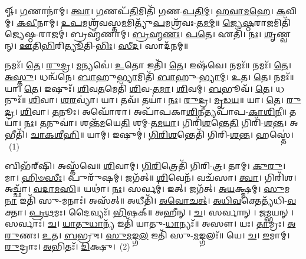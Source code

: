 \newcommand{\akhkhi}{\char"0916\char"094D\char"0916\char"093F\char"E009\hspace{-2ex} \char"E009\hspace{1.2ex}}

𑍐। \ul{𑌗}\-𑌣𑌾𑌨𑌾॑𑌮𑍍। \ul{𑌤𑍍𑌵𑌾}\-। \ul{𑌗}\-𑌣𑌪᳴\-\ul{𑌤𑌿}\-𑌮𑌿𑌤𑌿᳴ \ul{𑌗}\-𑌣-\-\ul{𑌪}\-\-\ul{𑌤𑌿}\-\-\ul{𑌮𑍍}\-। \ul{𑌹}\-\-\ul{𑌵𑌾}\-\-\ul{𑌮}\-\-\ul{𑌹𑍇}\-। \ul{𑌕}\-𑌵𑌿𑌮𑍍। \ul{𑌕}\-\-\ul{𑌵𑍀}\-𑌨𑌾𑌮𑍍। \ul{𑌉}\-\-\ul{𑌪}\-𑌮𑌶𑍍𑌰᳴𑌵𑌸𑍍𑌤\-\ul{𑌮}\-𑌮𑌿𑌤𑍍𑌯𑍁᳴\-\ul{𑌪}\-𑌮𑌶𑍍𑌰᳴𑌵𑌃-\-\ul{𑌤}\-\-\ul{𑌮}\-\-\ul{𑌮𑍍}\-॥ 
\-\ul{𑌜𑍍𑌯𑍇}\-\-\ul{𑌷𑍍𑌠}\-𑌰𑌾\-\ul{𑌜}\-𑌮𑌿𑌤𑌿᳴ 𑌜𑍍𑌯𑍇𑌷𑍍𑌠-𑌰𑌾𑌜𑌮𑍍॑। 𑌬𑍍𑌰𑌹𑍍𑌮᳴𑌣𑌾𑌮𑍍। \ul{𑌬𑍍𑌰}\-\-\ul{𑌹𑍍𑌮}\-\-\ul{𑌣𑌃}\-। \ul{𑌪}\-\-\ul{𑌤𑍇}\-। 𑌏𑌤𑌿᳴। \ul{𑌨𑌃}\-। \ul{𑌶𑍃}\-𑌣𑍍𑌵𑌨𑍍। \ul{𑌊}\-𑌤𑌿\-\ul{𑌭𑌿}\-𑌰𑌿\-\ul{𑌤𑍍𑌯𑍂}\-𑌤𑌿-\-\ul{𑌭𑌿𑌃}\-। \ul{𑌸𑍀}\-\-\ul{𑌦}\-। 𑌸𑌾𑌦᳴𑌨𑌮𑍍॥ 


𑌨𑌮𑌃᳴। \ul{𑌤𑍇}\-। \ul{𑌰𑍁}\-\-\ul{𑌦𑍍𑌰}\-। \ul{𑌮}\-𑌨𑍍𑌯𑌵𑍇॑। \ul{𑌉}\-𑌤𑍋 𑌇𑌤𑌿᳴। \ul{𑌤𑍇}\-। 𑌇𑌷᳴𑌵𑍇। 𑌨𑌮𑌃᳴॥ 
𑌨𑌮𑌃᳴। \ul{𑌤𑍇}\-। \ul{𑌅}\-\-\ul{𑌸𑍍𑌤𑍁}\-। 𑌧𑌨𑍍𑌵᳴𑌨𑍇। \ul{𑌬𑌾}\-𑌹𑍁\-\ul{𑌭𑍍𑌯𑌾}\-𑌮𑌿𑌤𑌿᳴ \ul{𑌬𑌾}\-𑌹𑍁-\-\ul{𑌭𑍍𑌯𑌾}\-\-\ul{𑌮𑍍}\-। \ul{𑌉}\-𑌤। \ul{𑌤𑍇}\-। 𑌨𑌮𑌃᳴॥ 
𑌯𑌾। \ul{𑌤𑍇}\-। 𑌇𑌷𑍁𑌃᳴। \ul{𑌶𑌿}\-𑌵\-\ul{𑌤}\-𑌮𑍇𑌤𑌿᳴ \ul{𑌶𑌿}\-𑌵-\-\ul{𑌤}\-\-\ul{𑌮𑌾}\-। \ul{𑌶𑌿}\-𑌵𑌮𑍍। \ul{𑌬}\-𑌭𑍂𑌵᳴। \ul{𑌤𑍇}\-। 𑌧𑌨𑍁𑌃᳴॥ 
\-\ul{𑌶𑌿}\-𑌵𑌾। \ul{𑌶}\-\-\ul{𑌰}\-𑌵𑍍𑌯𑌾॑। 𑌯𑌾। 𑌤𑌵᳴। 𑌤𑌯𑌾॑। \ul{𑌨𑌃}\-। \ul{𑌰𑍁}\-\-\ul{𑌦𑍍𑌰}\-। \ul{𑌮𑍃}\-\-\ul{𑌡}\-\-\ul{𑌯}\-॥ 
𑌯𑌾। \ul{𑌤𑍇}\-। \ul{𑌰𑍁}\-\-\ul{𑌦𑍍𑌰}\-। \ul{𑌶𑌿}\-𑌵𑌾। \ul{𑌤}\-𑌨𑍂𑌃। 𑌅𑌘𑍋᳴𑌰𑌾। 𑌅𑌪𑌾᳴𑌪𑌕𑌾\-\ul{𑌶𑌿}\-𑌨𑍀𑌤𑍍𑌯𑌪𑌾᳴𑌪-\-\ul{𑌕𑌾}\-\-\ul{𑌶𑌿}\-\-\ul{𑌨𑍀}\-॥ 
𑌤𑌯𑌾॑। \ul{𑌨𑌃}\-। \ul{𑌤}\-𑌨𑍁𑌵𑌾॑। 𑌶𑌨𑍍𑌤᳴\-\ul{𑌮}\-𑌯𑍇\-\ul{𑌤𑌿} 𑌶𑌮𑍍-\-\ul{𑌤}\-\-\ul{𑌮}\-\-\ul{𑌯𑌾}\-। 𑌗𑌿𑌰𑌿᳴\-\ul{𑌶}\-𑌨𑍍𑌤𑍇\-\ul{𑌤𑌿} 𑌗𑌿𑌰𑌿᳴-\-\ul{𑌶}\-\-\ul{𑌨𑍍𑌤}\-। 𑌅𑌭𑍀𑌤𑌿᳴। \ul{𑌚𑌾}\-\-\ul{𑌕}\-\-\ul{𑌶𑍀}\-\-\ul{𑌹𑌿}\-॥ 
𑌯𑌾𑌮𑍍। 𑌇𑌷𑍁𑌮𑍍॑। \ul{𑌗𑌿}\-\-\ul{𑌰𑌿}\-\-\ul{𑌶}\-𑌨𑍍𑌤𑍇𑌤𑌿᳴ 𑌗𑌿𑌰𑌿-\-\ul{𑌶}\-\-\ul{𑌨𑍍𑌤}\-। 𑌹𑌸𑍍𑌤𑍇॑।~(1)


𑌬𑌿𑌭᳴𑌰𑍍‌𑌷𑌿। 𑌅𑌸𑍍𑌤᳴𑌵𑍇॥ 
\-\ul{𑌶𑌿}\-𑌵𑌾𑌮𑍍। \ul{𑌗𑌿}\-\-\ul{𑌰𑌿}\-𑌤𑍍𑌰𑍇𑌤𑌿᳴ 𑌗𑌿𑌰𑌿-\-\ul{𑌤𑍍𑌰}\-। 𑌤𑌾𑌮𑍍। \ul{𑌕𑍁}\-\-\ul{𑌰𑍁}\-। 𑌮𑌾। \ul{𑌹𑌿}\-\-\ul{𑍞}\-\-\ul{𑌸𑍀𑌃}\-। 𑌪𑍁𑌰𑍁᳴𑌷𑌮𑍍। 𑌜𑌗᳴𑌤𑍍॥ 
\-\ul{𑌶𑌿}\-𑌵𑍇𑌨᳴। 𑌵𑌚᳴𑌸𑌾। \ul{𑌤𑍍𑌵𑌾}\-। 𑌗𑌿𑌰𑌿᳴𑌶। 𑌅𑌚𑍍𑌛𑌾᳴। \ul{𑌵}\-\-\ul{𑌦𑌾}\-\-\ul{𑌮}\-\-\ul{𑌸𑌿}\-॥ 
𑌯𑌥𑌾॑। \ul{𑌨𑌃}\-। 𑌸𑌰𑍍𑌵𑌮𑍍॑। 𑌇𑌤𑍍। 𑌜𑌗᳴𑌤𑍍। \ul{𑌅}\-\-\ul{𑌯}\-𑌕𑍍𑌷𑍍𑌮𑌮𑍍। \ul{𑌸𑍁}\-𑌮\-\ul{𑌨𑌾} 𑌇𑌤𑌿᳴ 𑌸𑍁-𑌮𑌨𑌾𑌃॑। 𑌅𑌸᳴𑌤𑍍॥ 
𑌅𑌧𑍀𑌤𑌿᳴। \ul{𑌅}\-\-\ul{𑌵𑍋}\-\-\ul{𑌚}\-\-\ul{𑌤𑍍}\-। \ul{𑌅}\-\-\ul{𑌧𑌿}\-\-\ul{𑌵}\-𑌕𑍍𑌤𑍇𑌤𑍍𑌯᳴𑌧𑌿-\-\ul{𑌵}\-𑌕𑍍𑌤𑌾। \ul{𑌪𑍍𑌰}\-\-\ul{𑌥}\-𑌮𑌃। 𑌦𑍈𑌵𑍍𑌯𑌃᳴। \ul{𑌭𑌿}\-𑌷𑌕𑍍॥ 
𑌅𑌹𑍀𑌨𑍍। \ul{𑌚}\-। 𑌸𑌰𑍍𑌵𑌾𑌨𑍍। \ul{𑌜}\-𑌮𑍍𑌭𑌯𑌨𑍍। 𑌸𑌰𑍍𑌵𑌾𑌃॑। \ul{𑌚}\-। \ul{𑌯𑌾}\-\-\ul{𑌤𑍁}\-\-\ul{𑌧𑌾}\-𑌨𑍍𑌯᳴ 𑌇𑌤𑌿᳴ 𑌯𑌾𑌤𑍁-\-\ul{𑌧𑌾}\-𑌨𑍍𑌯𑌃᳴॥ 
𑌅𑌸𑍗। 𑌯𑌃। \ul{𑌤𑌾}\-𑌮𑍍𑌰𑌃। \ul{𑌅}\-\-\ul{𑌰𑍁}\-𑌣𑌃। \ul{𑌉}\-𑌤। \ul{𑌬}\-𑌭𑍍𑌰𑍁𑌃। \ul{𑌸𑍁}\-\-\ul{𑌮}\-𑌙𑍍𑌗\-\ul{𑌲} 𑌇𑌤𑌿᳴ 𑌸𑍁-\-\ul{𑌮}\-𑌙𑍍𑌗𑌲𑌃᳴॥ 
𑌯𑍇। \ul{𑌚}\-। \ul{𑌇}\-𑌮𑌾𑌮𑍍। \ul{𑌰𑍁}\-𑌦𑍍𑌰𑌾𑌃। \ul{𑌅}\-𑌭𑌿𑌤𑌃᳴। \ul{𑌦𑌿}\-𑌕𑍍𑌷𑍁।~(2)


